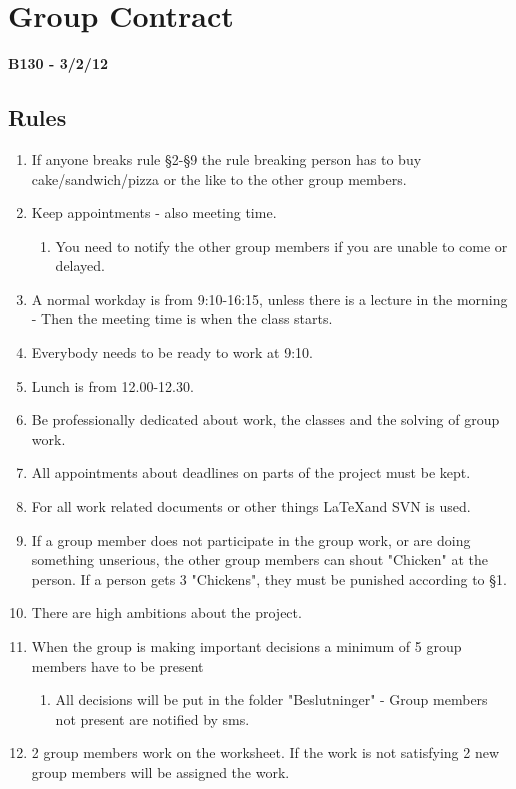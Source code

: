 \chapter{Group Contract}
\label{chap:groupcontract}
\textbf{B130 - 3/2/12}
\section*{Rules}
\renewcommand{\labelenumi}{§ \arabic{enumi}}
\renewcommand{\labelenumii}{\alph{enumii}}
\begin{enumerate}
\item If anyone breaks rule §2-§9 the rule breaking person has to buy cake/sandwich/pizza or the like to the other group members.
\item Keep appointments - also meeting time. 
	\begin{enumerate}
	\item You need to notify the other group members if you are unable to come or delayed.
	\end{enumerate}
\item A normal workday is from 9:10-16:15, unless there is a lecture in the morning - Then the meeting time is when the class starts.
\item Everybody needs to be ready to work at 9:10.
\item Lunch is from 12.00-12.30.
\item Be professionally dedicated about work, the classes and the solving of group work.
\item All appointments about deadlines on parts of the project must be kept.
\item For all work related documents or other things \LaTeX and SVN is used.
\item If a group member does not participate in the group work, or are doing something unserious, the other group members can shout "Chicken" at the person. If a person gets 3 "Chickens", they must be punished according to §1.
\item There are high ambitions about the project.
\item When the group is making important decisions a minimum of 5 group members have to be present 
	\begin{enumerate}
	\item All decisions will be put in the folder "Beslutninger" - Group members not present are notified by sms.
	\end{enumerate}
\item 2 group members work on the worksheet.  If the work is not satisfying 2 new group members will be assigned the work.

\end{enumerate}
